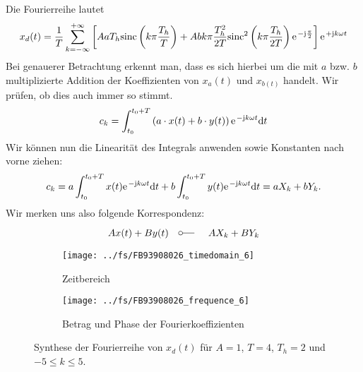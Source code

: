 \documentclass[11pt,a4paper,DIV=12]{scrartcl}
\newcommand{\diff}{\mathrm{d}}
\newcommand{\sinc}{\mathrm{sinc}}
\begin{document}
%
%
%
Die Fourierreihe lautet
%
\begin{gather}
	x_d(t)=\frac{1}{T}\sum_{k=-\infty}^{+\infty}\left[AaT_h\sinc\left(k\pi\frac{T_h}{T}\right)+Abk\pi\frac{T_h^2}{2T}\sinc^2\left(k\pi\frac{T_h}{2T}\right)\e^{-\im\frac{\pi}{2}}\right]\e^{+\im k \omega t}
\end{gather}
%
Bei genauerer Betrachtung erkennt man, dass es sich hierbei um die mit $a$ bzw. $b$
multiplizierte Addition der Koeffizienten von $x_a(t)$ und $x_{b(t)}$ handelt.
%
Wir prüfen, ob dies auch immer so stimmt.
%
\begin{align}
	c_k=\int_{t_0}^{t_0+T}\left (a\cdot x(t)+b\cdot y(t)\right )\e^{-\im k \omega t}\diff t
\end{align}
%
Wir können nun die Linearität des Integrals anwenden sowie Konstanten nach vorne ziehen:
\begin{align}
	c_k=a\int_{t_0}^{t_0+T}x(t)\e^{-\im k \omega t}\diff t+b\int_{t_0}^{t_0+T}y(t)\e^{-\im k \omega t}\diff t=aX_k+bY_k.
\end{align}
%
Wir merken uns also folgende Korrespondenz:
%
\begin{align}
	Ax(t)+By(t)\quad\fourier\quad AX_k+BY_k
\end{align}
%
%
\begin{figure}
	\centering
	\begin{subfigure}{\textwidth}
		\texttt{[image: ../fs/FB93908026\_timedomain\_6]}
		\caption{Zeitbereich}
	\end{subfigure}
	\begin{subfigure}{\textwidth}
		\texttt{[image: ../fs/FB93908026\_frequence\_6]}
		\caption{Betrag und Phase der Fourierkoeffizienten}
	\end{subfigure}
	\caption{Synthese der Fourierreihe von $x_d(t)$ für $A=1$, $T=4$, $T_h=2$ und
		$-5\leq k\leq5$.}
\end{figure}
\newpage
\end{document}

